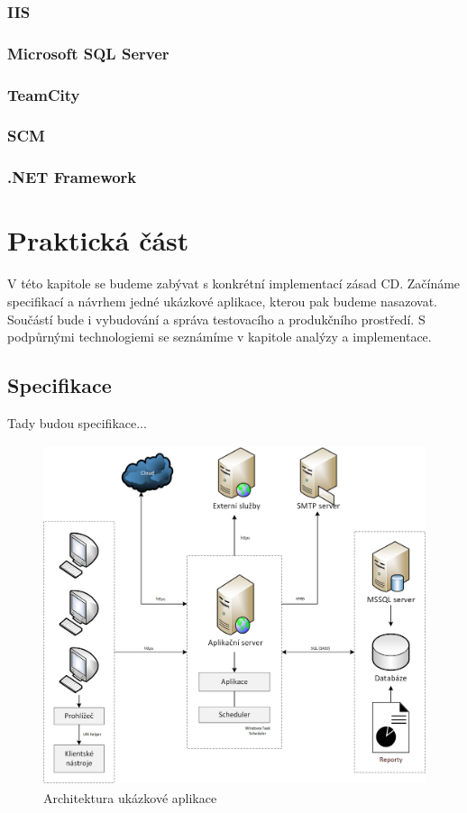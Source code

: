 \subsection{IIS}

\subsection{Microsoft SQL Server}

\subsection{TeamCity}

\subsection{SCM}

\subsection{.NET Framework}


\chapter{Praktická část}
\label{ch:impl}
V této kapitole se budeme zabývat s konkrétní implementací zásad CD. Začínáme specifikací a návrhem jedné ukázkové aplikace, kterou pak budeme nasazovat. Součástí bude i vybudování a správa testovacího a produkčního prostředí. S podpůrnými technologiemi se seznámíme v kapitole analýzy a implementace.

\section{Specifikace}
Tady budou specifikace...

\begin{figure}[]
  \centering
  \includegraphics[height=10cm]{fig/app_architektura.png}
  \caption{Architektura ukázkové aplikace}
  \label{fig:architektura}
\end{figure}

